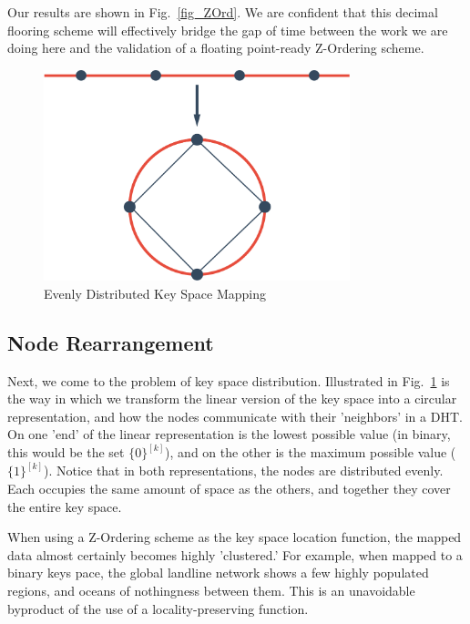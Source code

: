 \documentclass[10pt]{IEEEtran}
\begin{document}

\par Our results are shown in Fig.~\ref{fig_ZOrd}. We are confident that this decimal flooring scheme will effectively bridge the gap of time between the work we are doing here and the validation of a floating point-ready Z-Ordering scheme.

\begin{figure}[!t]
\centering
\includegraphics[width=3.5in]{finalRing}
\caption{Evenly Distributed Key Space Mapping}
\label{fig_kSpace}
\end{figure}

\subsection{Node Rearrangement}
\par Next, we come to the problem of key space distribution. Illustrated in Fig.~\ref{fig_kSpace} is the way in which we transform the linear version of the key space into a circular representation, and how the nodes communicate with their 'neighbors' in a DHT. On one 'end' of the linear representation is the lowest possible value (in binary, this would be the set $\{0\}^{[k]}$), and on the other is the maximum possible value ($\{1\}^{[k]}$). Notice that in both representations, the nodes are distributed evenly. Each occupies the same amount of space as the others, and together they cover the entire key space.

\par When using a Z-Ordering scheme as the key space location function, the mapped data almost certainly becomes highly 'clustered.' For example, when mapped to a binary keys pace, the global landline network shows a few highly populated regions, and oceans of nothingness between them. This is an unavoidable byproduct of the use of a locality-preserving function.
\end{document}
